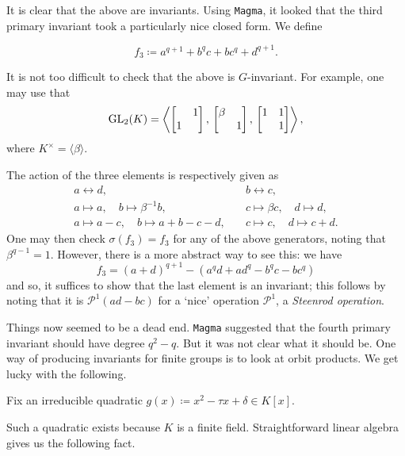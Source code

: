 \documentclass[12pt]{article}
\begin{document}
	It is clear that the above are invariants. 
	Using \texttt{Magma}, it looked that the third primary invariant took a particularly nice closed form.
	We define
	\begin{tcolorbox}
		\begin{equation*} 
			f_{3} \coloneqq a^{q + 1} + b^{q} c + b c^{q} + d^{q + 1}.
		\end{equation*}
	\end{tcolorbox}

	It is not too difficult to check that the above is $G$-invariant. 
	For example, one may use that 
	\begin{equation} \label{eq:gens}
		\operatorname{GL}_{2}(K) = \left\langle \begin{bmatrix}  & 1 \\ 1 &  \end{bmatrix},\, \begin{bmatrix} \beta &  \\  & 1 \end{bmatrix},\, \begin{bmatrix} 1 & 1 \\  & 1 \end{bmatrix} \right\rangle,
	\end{equation}
	where $K^{\times} = \langle \beta \rangle$. 

	The action of the three elements is respectively given as
	\begin{align*} 
		a \leftrightarrow d, \quad & b \leftrightarrow c, \\
		a \mapsto a, \quad b \mapsto \beta^{-1} b, \quad & c \mapsto \beta c,\quad d \mapsto d, \\
		a \mapsto a - c, \quad b \mapsto a + b - c - d, \quad & c \mapsto c, \quad d \mapsto c + d.
	\end{align*}
	One may then check $\sigma(f_{3}) = f_{3}$ for any of the above generators, noting that $\beta^{q - 1} = 1$. 
	However, there is a more abstract way to see this: we have
	\begin{equation*} 
		f_{3} = (a + d)^{q + 1} - (a^{q} d + a d^{q} - b^{q} c - b c^{q})
	\end{equation*}
	and so, it suffices to show that the last element is an invariant;
	this follows by noting that it is $\mathcal{P}^{1}(ad - bc)$ for a `nice' operation $\mathcal{P}^{1}$, a \emph{Steenrod operation}.

	Things now seemed to be a dead end. 
	\texttt{Magma} suggested that the fourth primary invariant should have degree $q^{2} - q$. 
	But it was not clear what it should be. 
	One way of producing invariants for finite groups is to look at orbit products. 
	We get lucky with the following. 

	\begin{tcolorbox}
		Fix an irreducible quadratic $g(x) \coloneqq x^{2} - \tau x + \delta \in K[x]$. 
	\end{tcolorbox}

	Such a quadratic exists because $K$ is a finite field. Straightforward linear algebra gives us the following fact.
\end{document}
